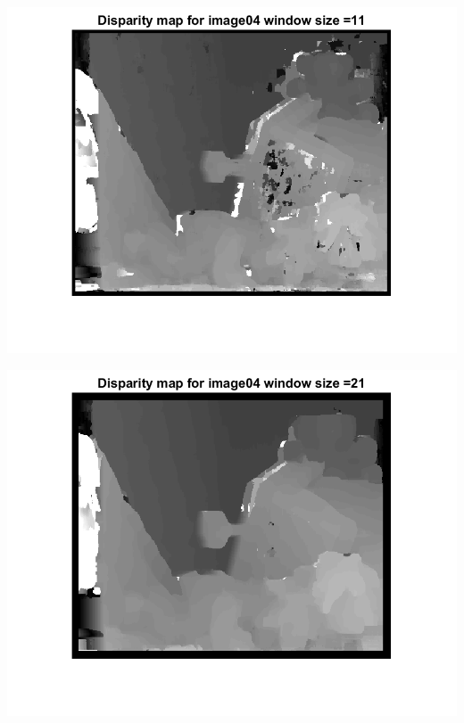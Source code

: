 \documentclass[a4paper]{iacas}
\begin{document}
\begin{minipage}{\linewidth}
	\includegraphics[scale=1]{results/04_16_06/disp_map_04_template_2.png}
	\label{fig_4}
\end{minipage}
\vskip 0.1in
\begin{minipage}{\linewidth}
	\includegraphics[scale=1]{results/04_16_06/disp_map_04_template_3.png}
	\label{fig_4}
\end{minipage}
\vskip 0.1in
\end{document}
